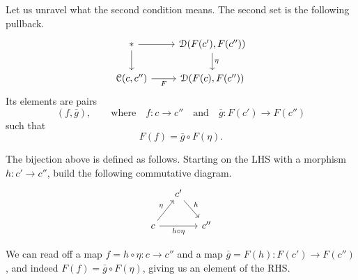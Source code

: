 \documentclass[main.tex]{subfiles}
\begin{document}
Let us unravel what the second condition means. The second set is the following pullback.
\begin{equation*}
  \begin{tikzcd}
    *
    \arrow[r]
    \arrow[d]
    &\mathcal{D}(F(c'), F(c''))
    \arrow[d, "\eta"]
    \\
    \mathcal{C}(c, c'')
    \arrow[r, swap, "F"]
    &\mathcal{D}(F(c), F(c''))
  \end{tikzcd}
\end{equation*}
Its elements are pairs
\begin{equation*}
  (f, \bar{g}),\qquad \text{where}\quad f\colon c \to c''\quad \text{and}\quad \bar{g}\colon F(c') \to F(c'')
\end{equation*}
such that
\begin{equation*}
  F(f) = \bar{g} \circ F(\eta).
\end{equation*}

The bijection above is defined as follows. Starting on the LHS with a morphism $h\colon c' \to c''$, build the following commutative diagram.
\begin{equation*}
  \begin{tikzcd}[column sep=small]
    & c'
    \arrow[dr, "h"]
    \\
    c
    \arrow[ur, "\eta"]
    \arrow[rr, swap, "h \circ \eta"]
    && c''
  \end{tikzcd}
\end{equation*}

We can read off a map $f = h \circ \eta\colon c \to c''$ and a map $\bar{g} = F(h)\colon F(c') \to F(c'')$, and indeed $F(f) = \bar{g} \circ F(\eta)$, giving us an element of the RHS.
\end{document}
